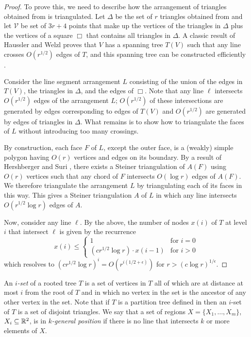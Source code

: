\documentclass{patmorin}
\begin{document}
\begin{proof}
  To prove this, we need to describe how the arrangement of triangles
  obtained from  is triangulated.  Let $\Delta$
  be the set of $r$ triangles obtained from  and
  let $\mathcal{V}$ be set of $3r+4$ points that make up the vertices
  of the triangles in $\Delta$ plus the vertices of a square $\Box$
  that contains all triangles in $\Delta$.  A classic result of Haussler
  and Welzl \cite{hw87} proves that $V$ has a spanning tree $T(V)$ such
  that any line crosses $O(r^{1/2})$ edges of $T$, and this spanning
  tree can be constructed efficiently \cite{cw89}.

  Consider the line segment arrangement $L$ consisting of the union of the
  edges in $T(V)$, the triangles in $\Delta$, and the edges of $\Box$.
  Note that any line $\ell$  intersects $O(r^{1/2})$ edges of the
  arrangement $L$; $O(r^{1/2})$ of these intersections are generated by
  edges corresponding to edges of $T(V)$ and $O(r^{1/2})$ are generated
  by edges of triangles in $\Delta$.  What remains is to show how to
  triangulate the faces of $L$ without introducing too many crossings.

  By construction, each face $F$ of $L$, except the outer face, is a
  (weakly) simple polygon having $O(r)$ vertices and edges on its
  boundary.  By a result of Hershberger and Suri \cite{hs95}, there
  exists a Steiner triangulation of $A(F)$ using $O(r)$ vertices such
  that any chord of $F$ intersects $O(\log r)$ edges of $A(F)$. We
  therefore triangulate the arrangement $L$ by triangulating each of
  its faces in this way.  This gives a Steiner triangulation $A$ of $L$
  in which any line intersects $O(r^{1/2}\log r)$ edges of $A$.

  Now, consider any line $\ell$. By the above, the number of nodes
  $x(i)$ of $T$ at level $i$ that intersect $\ell$ is given by
  the recurrence
  \[
     x(i)\le 
      \left\{
       \begin{array}{ll}
          1 & \mbox{for $i=0$} \\
          (cr^{1/2}\log r)\cdot x(i-1) & \mbox{for $i>0$}
       \end{array}
      \right.
\]
which resolves to $(cr^{1/2}\log r)^i= O(r^{i(1/2+\epsilon)})$ for 
$r>(c\log r)^{1/\epsilon}$.
\end{proof}

An \emph{$i$-set} of a rooted tree $T$ is a set of vertices in $T$ all
of which are at distance at most $i$ from the root of $T$ and in which
no vertex in the set is the ancestor of any other vertex in the set.
Note that if $T$ is a partition tree defined in 
then an $i$-set of $T$ is a set of disjoint triangles.  We say that
a set of regions $X=\{X_1,\ldots,X_m\}$, $X_i\subseteq\mathbb{R}^2$, is in
\emph{$k$-general position} if there is no line that intersects $k$
or more elements of $X$.
\end{document}
